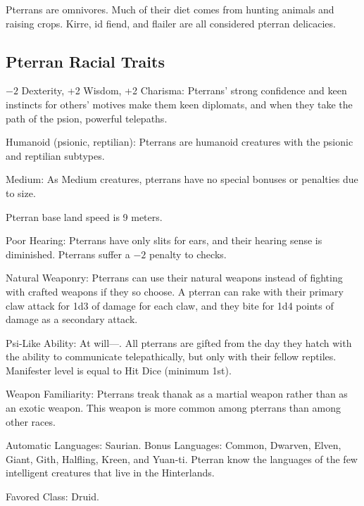 Pterrans are omnivores. Much of their diet comes from hunting animals and raising crops. Kirre, id fiend, and flailer are all considered pterran delicacies.

\subsection{Pterran Racial Traits}
\begin{itemize*}
    \item $-2$ Dexterity, +2 Wisdom, +2 Charisma: Pterrans' strong confidence and keen instincts for others' motives make them keen diplomats, and when they take the path of the psion, powerful telepaths.
    \item Humanoid (psionic, reptilian): Pterrans are humanoid creatures with the psionic and reptilian subtypes.
    \item Medium: As Medium creatures, pterrans have no special bonuses or penalties due to size.
    \item Pterran base land speed is 9 meters.
    \item Poor Hearing: Pterrans have only slits for ears, and their hearing sense is diminished. Pterrans suffer a $-2$ penalty to  checks.
    \item Natural Weaponry: Pterrans can use their natural weapons instead of fighting with crafted weapons if they so choose. A pterran can rake with their primary claw attack for 1d3 of damage for each claw, and they bite for 1d4 points of damage as a secondary attack.
    \item Psi-Like Ability: At will---. All pterrans are gifted from the day they hatch with the ability to communicate telepathically, but only with their fellow reptiles. Manifester level is equal to \onehalf Hit Dice (minimum 1st).
    \item Weapon Familiarity: Pterrans treak thanak as a martial weapon rather than as an exotic weapon. This weapon is more common among pterrans than among other races.
    \item Automatic Languages: Saurian. Bonus Languages: Common, Dwarven, Elven, Giant, Gith, Halfling, Kreen, and Yuan-ti. Pterran know the languages of the few intelligent creatures that live in the Hinterlands.
    \item Favored Class: Druid.
\end{itemize*}